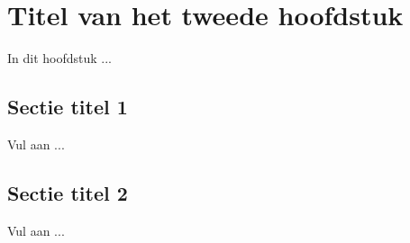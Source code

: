 \chapter{Titel van het tweede hoofdstuk}
\label{chap:rel_work}

In dit hoofdstuk ...

\section{Sectie titel 1}
\label{sec:related_work}
Vul aan ...
\section{Sectie titel 2}
Vul aan ...